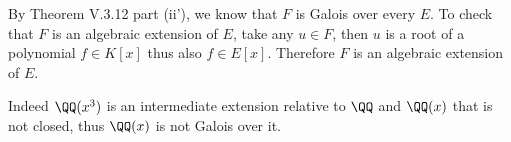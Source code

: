 By Theorem V.3.12 part (ii'), we know that $F$ is Galois over every $E$. 
To check that $F$ is an algebraic extension of $E$, take any $u\in F$, then $u$ is a root of a polynomial  $f\in K[x]$ thus also  $f\in E[x]$. 
Therefore $F$ is an algebraic extension of $E$.

Indeed $\QQ(x^3)$ is an intermediate extension relative to $\QQ$ and $\QQ(x)$ that is not closed, thus $\QQ(x)$ is not Galois over it.
